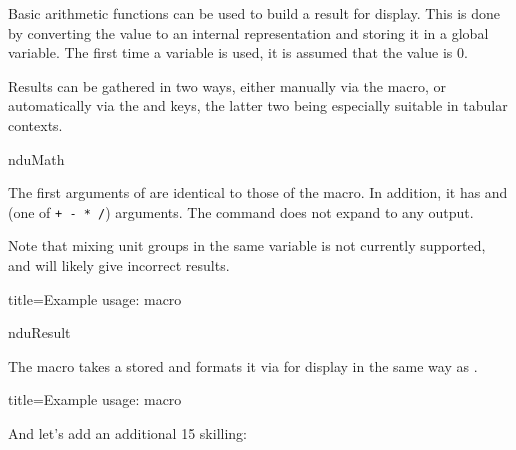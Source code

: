 \documentclass[
	a4paper,
	margin=4cm
]{article}
\begin{document}
Basic arithmetic functions can be used to build a result for display. This is done by converting the value to an internal representation and storing it in a global variable. The first time a variable is used, it is assumed that the value is 0.

Results can be gathered in two ways, either manually via the  macro, or automatically via the  and  keys, the latter two being especially suitable in tabular contexts.

\begin{docCommand}
	{nduMath}
	{}

	The first arguments of  are identical to those of the  macro. In addition, it has  and  (one of \texttt{+ - * /}) arguments. The command does not expand to any output.

	Note that mixing unit groups in the same variable is not currently supported, and will likely give incorrect results.

\begin{dispExample*}{
	title=Example usage:  macro
}
\end{dispExample*}

\end{docCommand}

\begin{docCommand}
	{nduResult}
	{}

	The  macro takes a stored  and formats it via  for display in the same way as .

\begin{dispExample*}{
	title=Example usage:  macro
}

And let's add an additional 15 skilling:
\end{dispExample*}

\end{docCommand}
\end{document}
